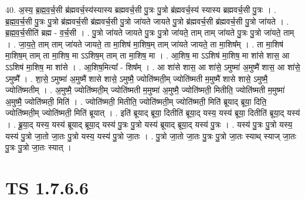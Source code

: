 \documentclass[17pt]{extarticle}
\begin{document}
40. अ॒स्य॒ ब्र॒ह्म॒व॒र्च॒सी ब्र॑ह्मवर्च॒स्य॑स्यास्य ब्रह्मवर्च॒सी पु॒त्रः पु॒त्रो ब्र॑ह्मवर्च॒स्य॑ स्यास्य ब्रह्मवर्च॒सी पु॒त्रः । . ब्र॒ह्म॒व॒र्च॒सी पु॒त्रः पु॒त्रो ब्र॑ह्मवर्च॒सी ब्र॑ह्मवर्च॒सी पु॒त्रो जा॑यते जायते पु॒त्रो ब्र॑ह्मवर्च॒सी ब्र॑ह्मवर्च॒सी पु॒त्रो जा॑यते । . ब्र॒ह्म॒व॒र्च॒सीति॑ ब्रह्म - व॒र्च॒सी । . पु॒त्रो जा॑यते जायते पु॒त्रः पु॒त्रो जा॑यते॒ ताम् ताम् जा॑यते पु॒त्रः पु॒त्रो जा॑यते॒ ताम् । . जा॒य॒ते॒ ताम् ताम् जा॑यते जायते॒ ता मा॒शिष॑ मा॒शिष॒म् ताम् जा॑यते जायते॒ ता मा॒शिष᳚म् । . ता मा॒शिष॑ मा॒शिष॒म् ताम् ता मा॒शिष॒ मा ऽऽशिष॒म् ताम् ता मा॒शिष॒ मा । . आ॒शिष॒ मा ऽऽशिष॑ मा॒शिष॒ मा शा॑से शास॒ आ ऽऽशिष॑ मा॒शिष॒ मा शा॑से । . आ॒शिष॒मित्या᳚ - शिष᳚म् । . आ शा॑से शास॒ आ शा॑से॒ ऽमुष्मा॑ अ॒मुष्मै॑ शास॒ आ शा॑से॒ ऽमुष्मै᳚ । . शा॒से॒ ऽमुष्मा॑ अ॒मुष्मै॑ शासे शासे॒ ऽमुष्मै॒ ज्योति॑ष्मती॒म् ज्योति॑ष्मती म॒मुष्मै॑ शासे शासे॒ ऽमुष्मै॒ ज्योति॑ष्मतीम् । . अ॒मुष्मै॒ ज्योति॑ष्मती॒म् ज्योति॑ष्मती म॒मुष्मा॑ अ॒मुष्मै॒ ज्योति॑ष्मती॒ मितीति॒ ज्योति॑ष्मती म॒मुष्मा॑ अ॒मुष्मै॒ ज्योति॑ष्मती॒ मिति॑ । . ज्योति॑ष्मती॒ मितीति॒ ज्योति॑ष्मती॒म् ज्योति॑ष्मती॒ मिति॑ ब्रूयाद् ब्रूया॒ दिति॒ ज्योति॑ष्मती॒म् ज्योति॑ष्मती॒ मिति॑ ब्रूयात् । . इति॑ ब्रूयाद् ब्रूया॒ दितीति॑ ब्रूया॒द् यस्य॒ यस्य॑ ब्रूया॒ दितीति॑ ब्रूया॒द् यस्य॑ । . ब्रू॒या॒द् यस्य॒ यस्य॑ ब्रूयाद् ब्रूया॒द् यस्य॑ पु॒त्रः पु॒त्रो यस्य॑ ब्रूयाद् ब्रूया॒द् यस्य॑ पु॒त्रः । . यस्य॑ पु॒त्रः पु॒त्रो यस्य॒ यस्य॑ पु॒त्रो जा॒तो जा॒तः पु॒त्रो यस्य॒ यस्य॑ पु॒त्रो जा॒तः । . पु॒त्रो जा॒तो जा॒तः पु॒त्रः पु॒त्रो जा॒तः स्याथ् स्याज् जा॒तः पु॒त्रः पु॒त्रो जा॒तः स्यात् । \newline
\pagebreak
{}
\section*{ TS 1.7.6.6 }
\end{document}
